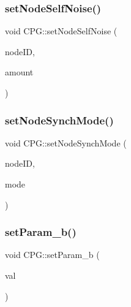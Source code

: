 \mbox{\label{classCPG_aec5c18fe5931482820d203e8e190eefe}} 
\subsubsection{\texorpdfstring{set\+Node\+Self\+Noise()}{setNodeSelfNoise()}}
{\footnotesize\ttfamily void C\+P\+G\+::set\+Node\+Self\+Noise (\begin{DoxyParamCaption}\item[{unsigned}]{node\+ID,  }\item[{double}]{amount }\end{DoxyParamCaption})}

\mbox{\label{classCPG_ad237f2dc49f5340b056cff42100af751}} 
\subsubsection{\texorpdfstring{set\+Node\+Synch\+Mode()}{setNodeSynchMode()}}
{\footnotesize\ttfamily void C\+P\+G\+::set\+Node\+Synch\+Mode (\begin{DoxyParamCaption}\item[{unsigned}]{node\+ID,  }\item[{\mbox{\hyperlink{classMatsuNode_a725e228db39b8842f851ddf88f640bed}{Matsu\+Node\+::synch\+Mode}}}]{mode }\end{DoxyParamCaption})}

\mbox{\label{classCPG_a7da2207c51449752c5fcaf242f2a01e9}} 
\subsubsection{\texorpdfstring{set\+Param\+\_\+b()}{setParam\_b()}}
{\footnotesize\ttfamily void C\+P\+G\+::set\+Param\+\_\+b (\begin{DoxyParamCaption}\item[{double}]{val }\end{DoxyParamCaption})}

\mbox{\label{classCPG_a21e3d9ae738df133b65efbc4ad4bb51a}} 
